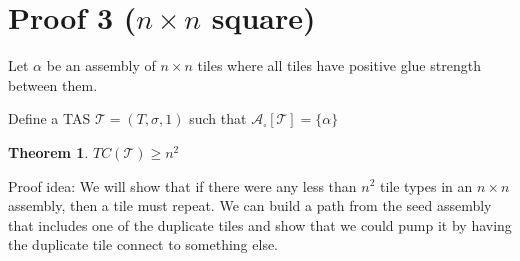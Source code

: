 \documentclass[12pt]{article}
\newtheorem{theorem}{Theorem}
\begin{document}
\section*{Proof 3 ($n \times n$ square)}

Let $\alpha$ be an assembly of $n \times n$ tiles where all tiles have positive glue strength between them.

Define a TAS $\mathcal{T} = (T, \sigma, 1)$ such that $\mathcal{A}_\square[\mathcal{T}] = \{ \alpha \}$


\begin{theorem}
	$TC(\mathcal{T}) \geq n^2$
\end{theorem}

Proof idea: We will show that if there were any less than $n^2$ tile types in an $n \times n$ assembly, then a tile must repeat. We can build a path from the seed assembly that includes one of the duplicate tiles and show that we could pump it by having the duplicate tile connect to something else.
\end{document}
